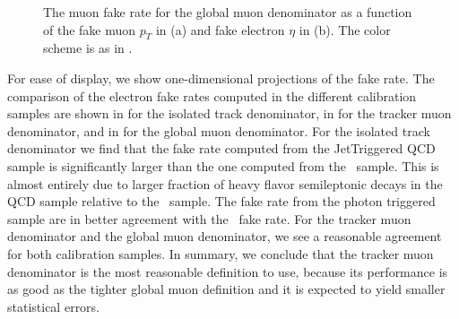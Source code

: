 \documentclass{cmspaper}
\begin{document}
\begin{figure}[htb]
  \begin{center}
    
    \caption{The muon fake rate for the global muon denominator as a function of the fake muon $p_T$ in (a) and fake electron $\eta$ in (b). The color  scheme is as in .}
    \label{fig:muonFakeRate_GlobalMuon}
  \end{center}
\end{figure}


For ease of display, we show one-dimensional projections of the fake rate. The comparison of the electron fake rates computed in the different calibration samples are shown in  for the isolated track denominator, in  for the tracker muon denominator, and in  for the global muon denominator. For the isolated track denominator we find that the fake rate computed from the JetTriggered QCD sample is significantly larger than the one computed from the \WPlusJets\ sample. This is almost entirely due to larger fraction of heavy flavor semileptonic decays in the QCD sample relative to the \WPlusJets\ sample. The fake rate from the photon triggered sample are in better agreement with the \WPlusJets\ fake rate. For the tracker muon denominator and the global muon denominator, we see a reasonable agreement for both calibration samples. In summary, we conclude that the tracker muon denominator is the most reasonable definition to use, because its performance is as good as the tighter global muon definition and it is expected to yield smaller statistical errors.
\end{document}
